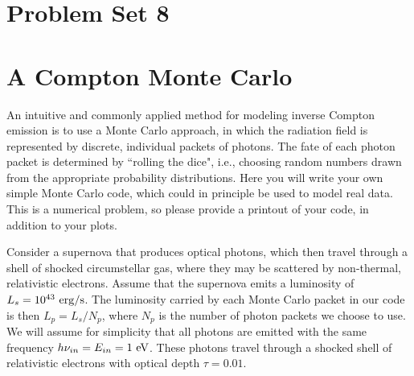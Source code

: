 \documentclass[11pt]{article}
\begin{document}
\pagestyle{empty}

\section*{\centering Problem Set 8}

\section{A Compton Monte Carlo}

An intuitive and commonly applied method for modeling inverse Compton
emission is to use a Monte Carlo approach, in which the radiation field is
represented by discrete, individual packets of photons. The fate of each photon
packet is determined by ``rolling the dice", i.e., choosing random numbers drawn
from the appropriate probability distributions. Here you will write your own
simple Monte Carlo code, which could in principle be used to model real data.
This is a numerical problem, so please provide a printout of your code, in
addition to your plots.

Consider a supernova that produces optical photons, which then travel through a
shell of shocked circumstellar gas, where they may be scattered by non-thermal,
relativistic electrons. Assume that the supernova emits a luminosity of
$L_s=10^{43}~{\rm erg}/{\rm s}$.  The luminosity carried by each Monte
Carlo packet in our code is then $L_p=L_s/N_p$, where $N_p$ is the number of
photon packets we choose to use.  We will assume for simplicity that all photons are emitted with
the same frequency $h\nu_{in}=E_{in}=1~{\rm eV}$.  
These photons travel through a shocked shell of relativistic electrons with optical depth
$\tau=0.01$.
\end{document}
